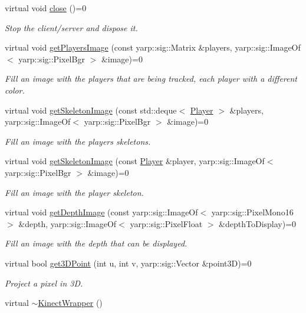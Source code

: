 \begin{DoxyCompactItemize}
virtual void \hyperlink{classkinectWrapper_1_1KinectWrapper_a9838a284ff45200ab7978bff25e3b4b3}{close} ()=0
\begin{DoxyCompactList}\small\item\em Stop the client/server and dispose it. \end{DoxyCompactList}\item 
virtual void \hyperlink{classkinectWrapper_1_1KinectWrapper_ad544a82270b338a2a07d66cf3883ca62}{get\+Players\+Image} (const yarp\+::sig\+::\+Matrix \&players, yarp\+::sig\+::\+Image\+Of$<$ yarp\+::sig\+::\+Pixel\+Bgr $>$ \&image)=0
\begin{DoxyCompactList}\small\item\em Fill an image with the players that are being tracked, each player with a different color. \end{DoxyCompactList}\item 
virtual void \hyperlink{classkinectWrapper_1_1KinectWrapper_a5ade44152da43fcae418e6baae7c713a}{get\+Skeleton\+Image} (const std\+::deque$<$ \hyperlink{structkinectWrapper_1_1Player}{Player} $>$ \&players, yarp\+::sig\+::\+Image\+Of$<$ yarp\+::sig\+::\+Pixel\+Bgr $>$ \&image)=0
\begin{DoxyCompactList}\small\item\em Fill an image with the players skeletons. \end{DoxyCompactList}\item 
virtual void \hyperlink{classkinectWrapper_1_1KinectWrapper_a97c51c1e4e1b2918e62aa7621d26b7dc}{get\+Skeleton\+Image} (const \hyperlink{structkinectWrapper_1_1Player}{Player} \&player, yarp\+::sig\+::\+Image\+Of$<$ yarp\+::sig\+::\+Pixel\+Bgr $>$ \&image)=0
\begin{DoxyCompactList}\small\item\em Fill an image with the player skeleton. \end{DoxyCompactList}\item 
virtual void \hyperlink{classkinectWrapper_1_1KinectWrapper_a51bbf5f801626d07bfe6059fd80d1a50}{get\+Depth\+Image} (const yarp\+::sig\+::\+Image\+Of$<$ yarp\+::sig\+::\+Pixel\+Mono16 $>$ \&depth, yarp\+::sig\+::\+Image\+Of$<$ yarp\+::sig\+::\+Pixel\+Float $>$ \&depth\+To\+Display)=0
\begin{DoxyCompactList}\small\item\em Fill an image with the depth that can be displayed. \end{DoxyCompactList}\item 
virtual bool \hyperlink{classkinectWrapper_1_1KinectWrapper_abc3df8e268fc0c8a799b1a1d061dde12}{get3\+D\+Point} (int u, int v, yarp\+::sig\+::\+Vector \&point3\+D)=0
\begin{DoxyCompactList}\small\item\em Project a pixel in 3\+D. \end{DoxyCompactList}\item 
virtual \hyperlink{classkinectWrapper_1_1KinectWrapper_a516e88d370169f4e3e1aa6bfed734538}{$\sim$\+Kinect\+Wrapper} ()\label{classkinectWrapper_1_1KinectWrapper_a516e88d370169f4e3e1aa6bfed734538}


\end{DoxyCompactItemize}
